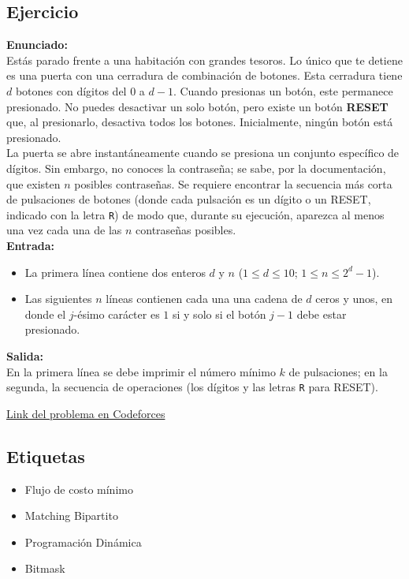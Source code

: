 ﻿\documentclass{article}
\theoremstyle{plain}
\theoremstyle{definition}
\begin{document}
\subsection{Ejercicio}
\label{sec:ejercicio}
\noindent
\textbf{Enunciado:} \\[1mm]
Estás parado frente a una habitación con grandes tesoros. Lo único que te detiene es una puerta con una cerradura de combinación de botones. Esta cerradura tiene \(d\) botones con dígitos del \(0\) a \(d-1\). Cuando presionas un botón, este permanece presionado. No puedes desactivar un solo botón, pero existe un botón \textbf{RESET} que, al presionarlo, desactiva todos los botones. Inicialmente, ningún botón está presionado.\\[2mm]
La puerta se abre instantáneamente cuando se presiona un conjunto específico de dígitos. Sin embargo, no conoces la contraseña; se sabe, por la documentación, que existen \(n\) posibles contraseñas. Se requiere encontrar la secuencia más corta de pulsaciones de botones (donde cada pulsación es un dígito o un RESET, indicado con la letra \texttt{R}) de modo que, durante su ejecución, aparezca al menos una vez cada una de las \(n\) contraseñas posibles.\\[2mm]
\textbf{Entrada:}
\begin{itemize}[noitemsep]
    \item La primera línea contiene dos enteros \(d\) y \(n\) (\(1\le d\le 10\); \(1\le n\le 2^d-1\)).
    \item Las siguientes \(n\) líneas contienen cada una una cadena de \(d\) ceros y unos, en donde el \(j\)-ésimo carácter es \(1\) si y solo si el botón \(j-1\) debe estar presionado.
\end{itemize}
\textbf{Salida:} \\[1mm]
En la primera línea se debe imprimir el número mínimo \(k\) de pulsaciones; en la segunda, la secuencia de operaciones (los dígitos y las letras \texttt{R} para RESET).

\medskip
\noindent
\href{https://codeforces.com/problemset/problem/1510/B}{Link del problema en Codeforces}

\subsection{Etiquetas}
\begin{itemize}[noitemsep]
    \item Flujo de costo mínimo
    \item Matching Bipartito
    \item Programación Dinámica
    \item Bitmask
\end{itemize}
\end{document}
